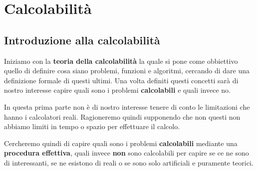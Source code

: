 \part{Calcolabilità}

\chapter{Introduzione alla calcolabilità}
Iniziamo con la \textbf{teoria della calcolabilità} la quale
si pone come obbiettivo quello di definire cosa siano problemi,
funzioni e algoritmi, cercando di dare una definizione formale
di questi ultimi. Una volta definiti questi concetti sarà di
nostro interesse capire quali sono i problemi
\textbf{calcolabili} e quali invece no.

In questa prima parte non è di nostro interesse tenere di conto
le limitazioni che hanno i calcolatori reali. Ragioneremo quindi
supponendo che non questi non abbiamo limiti in tempo o spazio
per effettuare il calcolo.

Cercheremo quindi di capire quali sono i problemi
\textbf{calcolabili} mediante una \textbf{procedura effettiva},
quali invece \textbf{non} sono calcolabili per capire se ce ne
sono di interessanti, se ne esistono di reali o se sono solo
artificiali e puramente teorici.
